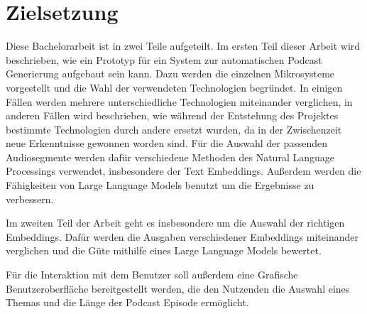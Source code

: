 





\section{Zielsetzung}

Diese Bachelorarbeit ist in zwei Teile aufgeteilt.
Im ersten Teil dieser Arbeit wird beschrieben, wie ein Prototyp für ein System zur automatischen Podcast Generierung aufgebaut sein kann.
Dazu werden die einzelnen Mikrosysteme vorgestellt und die Wahl der verwendeten Technologien begründet.
In einigen Fällen werden mehrere unterschiedliche Technologien miteinander verglichen, in anderen Fällen wird beschrieben, wie während der Entstehung des Projektes bestimmte Technologien durch andere ersetzt wurden, da in der Zwischenzeit neue Erkenntnisse gewonnen worden sind.
Für die Auswahl der passenden Audiosegmente werden dafür verschiedene Methoden des Natural Language Processings verwendet, insbesondere der Text Embeddings.
Außerdem werden die Fähigkeiten von Large Language Models benutzt um die Ergebnisse zu verbessern.

Im zweiten Teil der Arbeit geht es insbesondere um die Auswahl der richtigen Embeddings.
Dafür werden die Ausgaben verschiedener Embeddings miteinander verglichen und die Güte mithilfe eines Large Language Models bewertet.


Für die Interaktion mit dem Benutzer soll außerdem eine Grafische Benutzeroberfläche bereitgestellt werden, die den Nutzenden die Auswahl eines Themas und die Länge der Podcast Episode ermöglicht.

